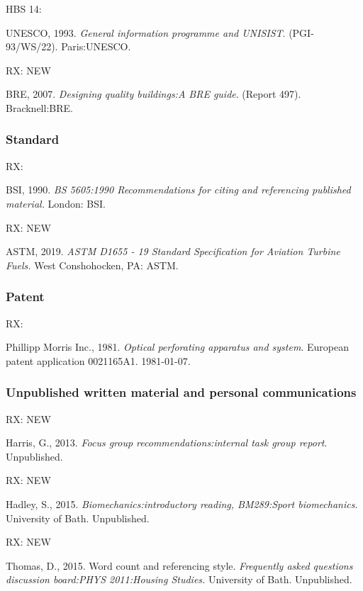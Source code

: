 HBS 14: \cite{unesco1993gip}

UNESCO, 1993. \emph{General information programme and UNISIST}\@. (PGI-93/WS/22). Paris:\@ UNESCO.


RX: \cite{bre2007dqb} NEW

BRE, 2007. \emph{Designing quality buildings:\@ A BRE guide}. (Report 497). Bracknell:\@ BRE.



\subsubsection*{Standard}

RX: \cite{bs5605:1990}

BSI, 1990. \emph{BS 5605:1990 Recommendations for citing and referencing
published material.} London: BSI.


RX: \cite{astm.d1655} NEW

ASTM, 2019. \emph{ASTM D1655 - 19 Standard Specification for Aviation
Turbine Fuels.} West Conshohocken, PA: ASTM.



\subsubsection*{Patent}

RX: \cite{pm1981opa}

Phillipp Morris Inc., 1981. \emph{Optical perforating apparatus and system}. European patent application 0021165A1. 1981-01-07.



\subsubsection*{Unpublished written material and personal communications}

RX: \cite{harris2013fgr} NEW

Harris, G., 2013. \emph{Focus group recommendations:\@ internal task group
report}. Unpublished.


RX: \cite{hadley2015bir} NEW

Hadley, S., 2015. \emph{Biomechanics:\@ introductory reading, BM289:\@ Sport
biomechanics}. University of Bath. Unpublished.


RX: \cite{thomas2015wcr} NEW

Thomas, D., 2015. Word count and referencing style. \emph{Frequently
asked questions discussion board:\@ PHYS 2011:\@ Housing Studies.}
University of Bath. Unpublished.



